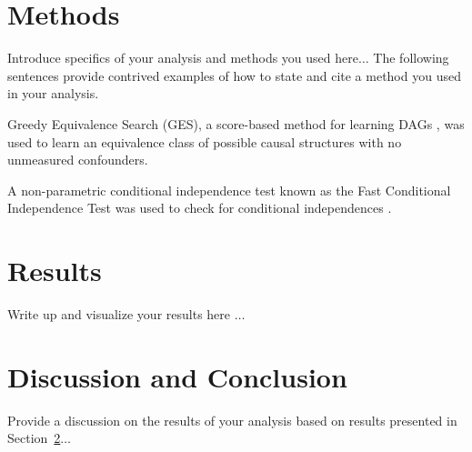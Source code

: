 \documentclass[twoside,11pt]{article}
\begin{document}
\section{Methods}
\label{sec:methods}
Introduce specifics of your analysis and methods you used here$\dots$ The following sentences provide contrived examples of how to  state and cite a method you used in your analysis. 

Greedy Equivalence Search (GES), a score-based method for learning DAGs \citep{chickering2002optimal}, was used to learn an equivalence class of possible causal structures with no unmeasured confounders.

A non-parametric conditional independence test known as the Fast Conditional Independence Test was used to check for conditional independences \citep{chalupka2018fast}.


\section{Results}
\label{sec:results}
Write up and visualize your results here $\dots$

\section{Discussion and Conclusion}
\label{sec:discussion}
Provide a discussion on the results of your analysis based on results presented in Section~\ref{sec:results}$\dots$


\newpage

\end{document}
